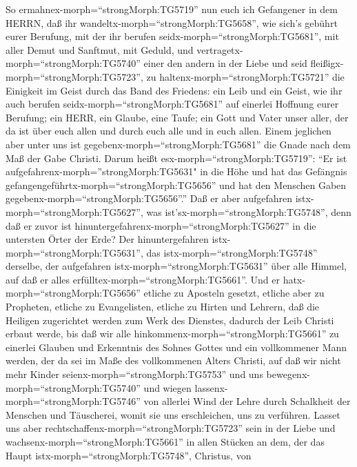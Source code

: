  So ermahnex-morph=``strongMorph:TG5719'' nun euch ich
Gefangener in dem HERRN, daß ihr wandeltx-morph=``strongMorph:TG5658'',
wie sich's gebührt eurer Berufung, mit der ihr berufen
seidx-morph=``strongMorph:TG5681'',  mit aller Demut und
Sanftmut, mit Geduld, und vertragetx-morph=``strongMorph:TG5740'' einer
den andern in der Liebe  und seid
fleißigx-morph=``strongMorph:TG5723'', zu
haltenx-morph=``strongMorph:TG5721'' die Einigkeit im Geist durch das
Band des Friedens:  ein Leib und ein Geist, wie ihr auch
berufen seidx-morph=``strongMorph:TG5681'' auf einerlei Hoffnung eurer
Berufung;  ein HERR, ein Glaube, eine Taufe; 
ein Gott und Vater unser aller, der da ist über euch allen und durch
euch alle und in euch allen.  Einem jeglichen aber unter uns
ist gegebenx-morph=``strongMorph:TG5681'' die Gnade nach dem Maß der
Gabe Christi.  Darum heißt esx-morph=``strongMorph:TG5719'':
``Er ist aufgefahrenx-morph=''strongMorph:TG5631" in die Höhe und hat
das Gefängnis gefangengeführtx-morph=``strongMorph:TG5656'' und hat den
Menschen Gaben gegebenx-morph=``strongMorph:TG5656''.''  Daß
er aber aufgefahren istx-morph=``strongMorph:TG5627'', was
ist'sx-morph=``strongMorph:TG5748'', denn daß er zuvor ist
hinuntergefahrenx-morph=``strongMorph:TG5627'' in die untersten Örter
der Erde?  Der hinuntergefahren
istx-morph=``strongMorph:TG5631'', das istx-morph=``strongMorph:TG5748''
derselbe, der aufgefahren istx-morph=``strongMorph:TG5631'' über alle
Himmel, auf daß er alles erfülltex-morph=``strongMorph:TG5661''.
 Und er hatx-morph=``strongMorph:TG5656'' etliche zu
Aposteln gesetzt, etliche aber zu Propheten, etliche zu Evangelisten,
etliche zu Hirten und Lehrern,  daß die Heiligen
zugerichtet werden zum Werk des Dienstes, dadurch der Leib Christi
erbaut werde,  bis daß wir alle
hinkommenx-morph=``strongMorph:TG5661'' zu einerlei Glauben und
Erkenntnis des Sohnes Gottes und ein vollkommener Mann werden, der da
sei im Maße des vollkommenen Alters Christi,  auf daß wir
nicht mehr Kinder seienx-morph=``strongMorph:TG5753'' und uns
bewegenx-morph=``strongMorph:TG5740'' und wiegen
lassenx-morph=``strongMorph:TG5746'' von allerlei Wind der Lehre durch
Schalkheit der Menschen und Täuscherei, womit sie uns erschleichen, uns
zu verführen.  Lasset uns aber
rechtschaffenx-morph=``strongMorph:TG5723'' sein in der Liebe und
wachsenx-morph=``strongMorph:TG5661'' in allen Stücken an dem, der das
Haupt istx-morph=``strongMorph:TG5748'', Christus,  von
